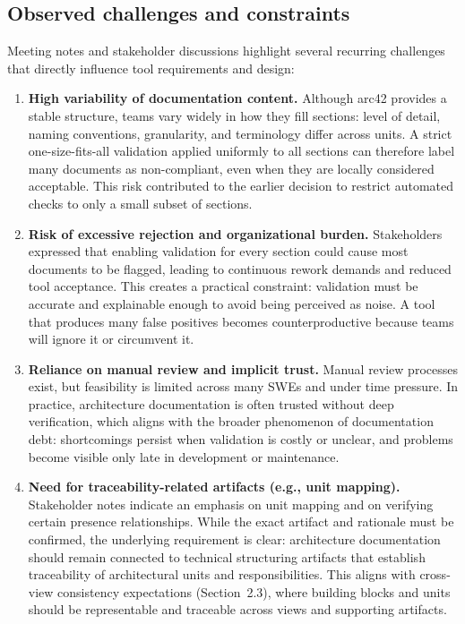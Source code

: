 \subsection{Observed challenges and constraints}
Meeting notes and stakeholder discussions highlight several recurring challenges that directly influence tool requirements and design:

\begin{enumerate}
    \item \textbf{High variability of documentation content.}
    Although arc42 provides a stable structure, teams vary widely in how they fill sections: level of detail, naming conventions, granularity, and terminology differ across units. A strict one-size-fits-all validation applied uniformly to all sections can therefore label many documents as non-compliant, even when they are locally considered acceptable. This risk contributed to the earlier decision to restrict automated checks to only a small subset of sections.

    \item \textbf{Risk of excessive rejection and organizational burden.}
    Stakeholders expressed that enabling validation for every section could cause most documents to be flagged, leading to continuous rework demands and reduced tool acceptance. This creates a practical constraint: validation must be accurate and explainable enough to avoid being perceived as noise. A tool that produces many false positives becomes counterproductive because teams will ignore it or circumvent it.

    \item \textbf{Reliance on manual review and implicit trust.}
    Manual review processes exist, but feasibility is limited across many SWEs and under time pressure. In practice, architecture documentation is often trusted without deep verification, which aligns with the broader phenomenon of documentation debt: shortcomings persist when validation is costly or unclear, and problems become visible only late in development or maintenance.

    \item \textbf{Need for traceability-related artifacts (e.g., unit mapping).}
    Stakeholder notes indicate an emphasis on unit mapping and on verifying certain presence relationships. While the exact artifact and rationale must be confirmed, the underlying requirement is clear: architecture documentation should remain connected to technical structuring artifacts that establish traceability of architectural units and responsibilities. This aligns with cross-view consistency expectations (Section~2.3), where building blocks and units should be representable and traceable across views and supporting artifacts.


\end{enumerate}
